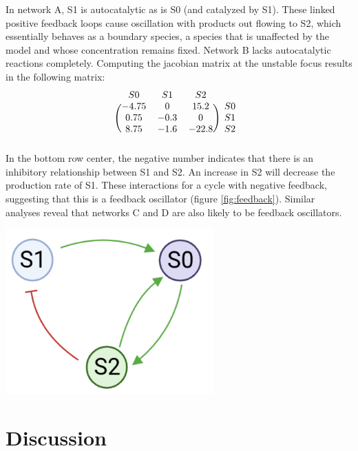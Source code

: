 \documentclass[12pt]{report}
\begin{document}
In network A, S1 is autocatalytic as is S0 (and catalyzed by S1). These linked positive feedback loops cause oscillation with products out flowing to S2, which essentially behaves as a boundary species, a species that is unaffected by the model and whose concentration remains fixed.  Network B lacks autocatalytic reactions completely. Computing the jacobian matrix at the unstable focus results in the following matrix:
\[
\begin{blockarray}{cccc}
S0 & S1 & S2 \\
\begin{block}{(ccc)c}
  -4.75 & 0 & 15.2 & S0 \\
  0.75 & -0.3 & 0 & S1 \\
  8.75 & -1.6 & -22.8 & S2 \\
\end{block}
\end{blockarray}
 \]
In the bottom row center, the negative number indicates that there is an inhibitory relationship between S1 and S2. An increase in S2 will decrease the production rate of S1. These interactions for a cycle with negative feedback, suggesting that this is a feedback oscillator (figure \ref{fig:feedback}). Similar analyses reveal that networks C and D are also likely to be feedback oscillators.

\begin{center}
    \includegraphics[width=8cm]{images/feedback-cycle.png}
    \label{fig:feedback}
\end{center}


\section{Discussion}
\end{document}
